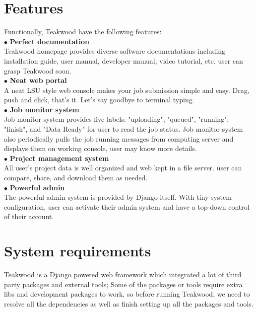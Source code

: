 \section{Features}
Functionally, Teakwood have the following features:\\

$\bullet$ \textbf{Perfect documentation}\\
Teakwood homepage provides diverse software documentations including installation guide, user manual, developer manual, video tutorial, etc. user can grasp Teakwood soon.\\

$\bullet$ \textbf{Neat web portal}\\
A neat LSU style web console makes your job submission simple and easy. Drag, push and click, that's it. Let's say goodbye to terminal typing.\\

$\bullet$ \textbf{Job monitor system}\\
Job monitor system provides five labels: "uploading", "queued", "running", "finish", and "Data Ready" for user to read the job status. Job monitor system also periodically pulls the job running messages from computing server and displays them on working console, user may know more details.\\

$\bullet$ \textbf{Project management system}\\
All user's project data is well organized and web kept in a file server. user can compare, share, and download them as needed.\\

$\bullet$ \textbf{Powerful admin}\\
The powerful admin system is provided by Django itself. With tiny system configuration, user can activate their admin system and have a top-down control of their account.\\


\section{System requirements}

Teakwood is a Django powered web framework which integrated a lot of third party packages and external tools; Some of the packages or tools require extra libs and development packages to work, so before running Teakwood, we need to resolve all the dependencies as well as finish setting up all the packages and tools.\\

